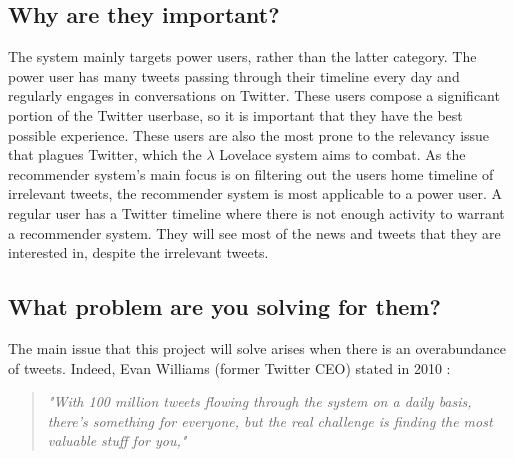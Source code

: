 \documentclass{article}
\begin{document}
\subsection{Why are they important?}
The system mainly targets power users, rather than the latter category. The power user has many tweets passing through their timeline every day and regularly engages in conversations on Twitter. These users compose a significant portion of the Twitter userbase, so it is important that they have the best possible experience. These users are also the most prone to the relevancy issue that plagues Twitter, which the $\lambda$ Lovelace system aims to combat.
As the recommender system's main focus is on filtering out the users home timeline of irrelevant tweets, the recommender system is most applicable to a power user. A regular user has a Twitter timeline where there is not enough activity to warrant a recommender system. They will see most of the news and tweets that they are interested in, despite the irrelevant tweets. 

\subsection{What problem are you solving for them?}
The main issue that this project will solve arises when there is an overabundance of tweets. Indeed, Evan Williams (former Twitter CEO) stated in 2010 \cite{ceo}:

\begin{quote}
    \emph{\small "With 100 million tweets flowing through the system on a daily basis, there's something for everyone, but the real challenge is finding the most valuable stuff for you,"}  
\end{quote}
\end{document}
